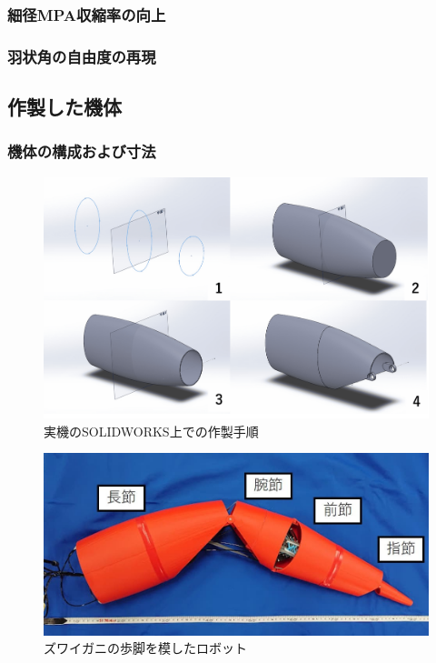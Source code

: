 \subsubsection{細径MPA収縮率の向上}

\subsubsection{羽状角の自由度の再現}

\subsection{作製した機体}
\subsubsection{機体の構成および寸法}
\begin{figure}[t]
  \begin{minipage}{1\hsize}
    \centering
    \includegraphics[scale=0.12]{image/kitaimethod.png}
    \caption{実機のSOLIDWORKS上での作製手順}
    \label{fig:solidw}
  \end{minipage}
\end{figure}
%
\begin{figure}[tbp]
  \centering
  \includegraphics[scale=0.29]{image/robot_scale.JPG}
  \caption{ズワイガニの歩脚を模したロボット}
  \label{fig:jikki}
\end{figure}
